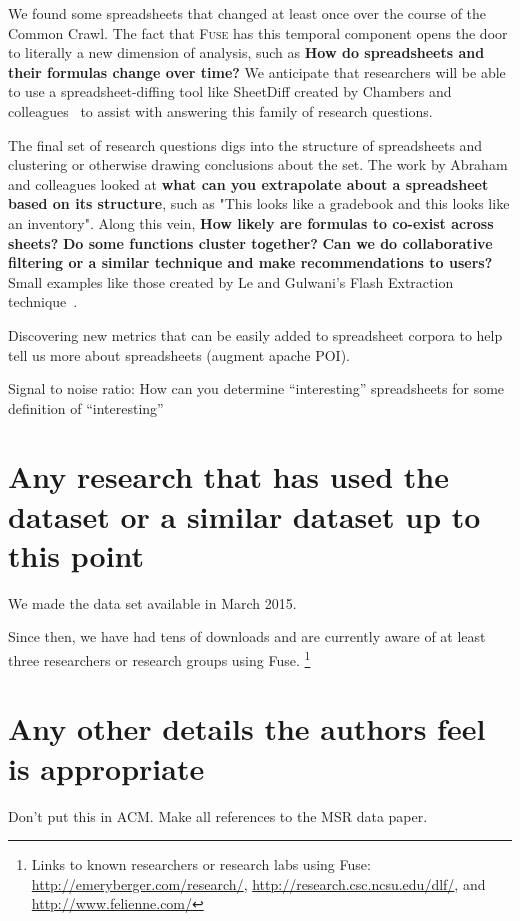 \documentclass[conference]{IEEEtran}
\begin{document}
We found some spreadsheets that changed at least once over the course of the Common Crawl.
The fact that \textsc{Fuse} has this temporal component opens the door to literally a new dimension of analysis, such as \textbf{How do spreadsheets and their formulas change over time?}
We anticipate that researchers will be able to use a spreadsheet-diffing tool like SheetDiff created by Chambers and colleagues~\cite{chambers2010} to assist with answering this family of research questions.

The final set of research questions digs into the structure of spreadsheets and clustering or otherwise drawing conclusions about the set.
The work by Abraham and colleagues \cite{Abraham2006} looked at \textbf{what can you extrapolate about a spreadsheet based on its structure}, such as "This looks like a gradebook and this looks like an inventory".
Along this vein, \textbf{How likely are formulas to co-exist across sheets?} 
\textbf{Do some functions cluster together? }
\textbf{Can we do collaborative filtering or a similar technique and make recommendations to users? }
Small examples like those created by Le and Gulwani's Flash Extraction technique~\cite{le2014}.  

Discovering new metrics that can be easily added to spreadsheet corpora to help tell us more about spreadsheets (augment apache POI).

Signal to noise ratio: How can you determine ``interesting'' spreadsheets for some definition of ``interesting''

\section{Any research that has used the dataset or a similar dataset up to this point}
We made the data set available in March 2015.  

Since then, we have had tens of downloads and are currently aware of at least three researchers or research groups using Fuse.  
\footnote{Links to known researchers or research labs using Fuse: \url{http://emeryberger.com/research/}, \url{http://research.csc.ncsu.edu/dlf/}, and \url{http://www.felienne.com/}}




\section{Any other details the authors feel is appropriate}
Don't put this in ACM.  Make all references to the MSR data paper.
\end{document}
